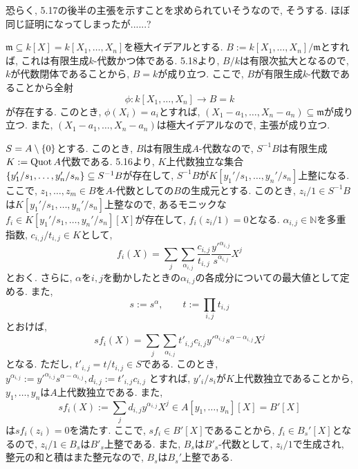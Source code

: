 \documentclass[dvipdfmx]{jsarticle}
\begin{document}
    \color{red}
        恐らく, 5.17の後半の主張を示すことを求められていそうなので, そうする.
        ほぼ同じ証明になってしまったが......?
    \color{black}

    \begin{problem}
        $\mathfrak{m} \subseteq k[X] = k[X_1, \dots, X_n]$を極大イデアルとする.
        $B := k[X_1, \dots, X_n]/\mathfrak{m}$とすれば, これは有限生成$k$-代数かつ体である.
        5.18より, $B/k$は有限次拡大となるので,
        $k$が代数閉体であることから, $B = k$が成り立つ.
        ここで, $B$が有限生成$k$-代数であることから全射
        \[
            \phi: k[X_1, \dots, X_n] \longrightarrow B = k
        \]
        が存在する.
        このとき,
        $\phi(X_i) = a_i$とすれば, $(X_1-a_1, \dots, X_n - a_n) \subseteq \mathfrak{m}$が成り立つ.
        また, $(X_1 -a_1, \dots, X_n - a_n)$は極大イデアルなので, 主張が成り立つ.
    \end{problem}

    \begin{problem}
        $S =  A \setminus \{0\}$とする.
        このとき, $B$は有限生成$A$-代数なので, $S^{-1}B$は有限生成$K:= \operatorname{Quot}{A}$代数である.
        5.16より,
        $K$上代数独立な集合$\{y_1'/s_1, \dots, y_n'/s_n\} \subseteq S^{-1}B$が存在して,
        $S^{-1}B$が$K[y_1'/s_1, \dots, y_n'/s_n]$上整になる.
        ここで, $z_1, \dots, z_m \in B$を$A$-代数としての$B$の生成元とする.
        このとき, $z_i / 1 \in S^{-1}B$は$K[y_1'/s_1, \dots, y_n'/s_n]$上整なので,
        あるモニックな$f_i \in K[y_1'/s_1, \dots, y_n'/s_n][X]$が存在して, $f_i(z_i/1) = 0$となる.
        $\alpha_{i,j} \in \mathbb{N}$を多重指数, $c_{i,j}/t_{i,j} \in K$として,
        \[
            f_i(X) = \sum_{j} \sum_{\alpha_{i,j}} \frac{c_{i,j}}{t_{i,j}} \frac{{y'}^{\alpha_{i,j}}}{s^{\alpha_{i,j}}} X^j
        \]
        とおく.
        さらに, $\alpha$を$i,j$を動かしたときの$\alpha_{i,j}$の各成分についての最大値として定める.
        また,
        \[
            s := s^\alpha, \quad \quad t := \prod_{i,j} t_{i,j}
        \]
        とおけば,
        \[
            sf_i(X) = \sum_{j} \sum_{\alpha_{i,j}}  t'_{i,j} c_{i,j} {y'}^{\alpha_{i,j}}{s^{\alpha-\alpha_{i,j}}} X^j
        \]
        となる.
        ただし, $t'_{i,j} = t/t_{i,j} \in S$である.
        このとき, $y^{\alpha_{i,j}} := y'^{\alpha_{i,j}}s^{\alpha-\alpha_{i,j}}, d_{i,j} := t'_{i,j}c_{i,j}$
        とすれば, $y'_i/s_i$が$K$上代数独立であることから, $y_1, \dots, y_n$は$A$上代数独立である.
        また,
        \[
            sf_i(X) := \sum_{j} d_{i,j}y^{\alpha_{i,j}}X^j \in A[y_1, \dots, y_n][X] = B'[X]
        \]
        は$sf_i(z_i) = 0$を満たす.
        ここで, $sf_i \in B'[X]$であることから, $f_i \in B_s'[X]$となるので,
        $z_i/1 \in B_s$は$B'_s$上整である.
        また, $B_s$は$B'_s$-代数として, $z_i/1$で生成され,
        整元の和と積はまた整元なので, $B_s$は$B_s'$上整である.
    \end{problem}
\end{document}
